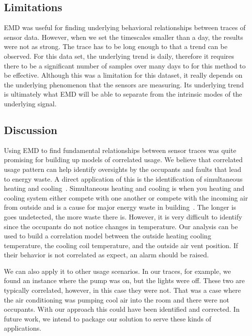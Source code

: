 \subsection{Limitations}
EMD was useful for finding underlying behavioral relationships between traces of sensor data.  However,
when we set the timescales smaller than a day, the results were not as strong.
The trace has to be long enough to that a trend can be observed.  For this data set, the underlying
trend is daily, therefore it requires there to be a significant number of samples over many days to
for this method to be effective.
Although this was a limitation for this dataset, it really depends on the underlying phenomenon that
the sensors are measuring.  Its underlying trend is ultimately what EMD will be able to separate
from the intrinsic modes of the underlying signal.

\subsection{Discussion}
Using EMD to find fundamental relationships between sensor traces was quite promising for building
up models of correlated usage.  We believe that correlated usage pattern can help identify oversights
by the occupants and faults that lead to energy waste.  A direct application of this is the identification
of simultaneous heating and cooling~\cite{simheatcool}.  Simultaneous heating and cooling is when you heating
and cooling system either compete with one another or compete with the incoming air from outside and is
a cause for major energy waste in building~\cite{simheatcool}.  The longer is goes undetected,
the more waste there is.  However, it is very difficult to identify since the occupants do not notice
changes in temperature.  Our analysis can be used to build a correlation model between the outside
heating cooling temperature, the cooling coil temperature, and the outside air vent position.  If their behavior
is not correlated as expect, an alarm should be raised.

We can also apply it to other usage scenarios.  In our traces, for example, we found an instance where the pump
was on, but the lights were off.  These two are typically correlated, however, in this case they were not.
That was a case where the air conditioning was pumping cool air into the room and there were not occupants.
With our approach this could have been identified and corrected.  In future work, we intend to
package our solution to serve these kinds of applications.

